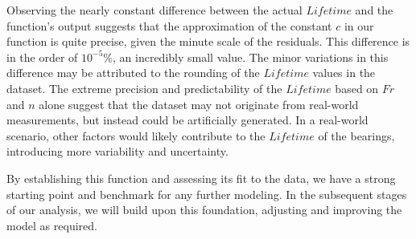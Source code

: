 Observing the nearly constant difference between the actual $Lifetime$ and the function's output suggests that the approximation of the constant $c$ in our function is quite precise, given the minute scale of the residuals. This difference is in the order of $10^{-5}\%$, an incredibly small value. The minor variations in this difference may be attributed to the rounding of the $Lifetime$ values in the dataset. The extreme precision and predictability of the $Lifetime$ based on $Fr$ and $n$ alone suggest that the dataset may not originate from real-world measurements, but instead could be artificially generated. In a real-world scenario, other factors would likely contribute to the $Lifetime$ of the bearings, introducing more variability and uncertainty.

By establishing this function and assessing its fit to the data, we have a strong starting point and benchmark for any further modeling. In the subsequent stages of our analysis, we will build upon this foundation, adjusting and improving the model as required.
